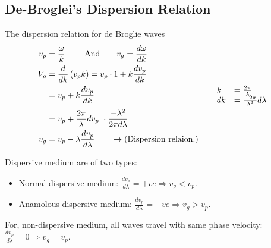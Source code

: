 \subsection{De-Broglei's Dispersion Relation}
The dispersion relation for de Broglie waves 
\begin{align}
v_{p}&=\frac{\omega}{k}\ \qquad \text{And}\qquad v_{g}=\frac{d\omega}{dk}\\
V_{g} &=\frac{d}{d k}\left(v_{p} k\right) 
=v_{p}\cdot 1+ k \frac{d v_{p}}{d k} \notag \\
&=v_{p}+k \frac{d v_{p}}{d{k}} \hspace{5cm}  \begin{array}{ll}
k&=\frac{2 \pi}{\lambda}\\
dk&=\frac{-2 \pi}{\lambda^{2}} d\lambda
\end{array}  \\
&=v_{p}+\frac{2 \pi}{\lambda}  d v_{p}\ \cdot \frac{-\lambda^{2}}{2 \pi d \lambda} \notag \\
v_{g} &=v_{p}-\lambda \frac{d v_{p}}{d \lambda}  \qquad\rightarrow (\text{Dispersion relaion.})
\end{align}
\begin{center}
\end{center}
Dispersive medium are of two types:
\begin{itemize}
	\item  Normal dispersive medium: $\frac{d v_{p}}{d \lambda}=+v e \Rightarrow v_{g}<v_{p}$.
	\item  Anamolous dispersive medium: $\frac{d v_{p}}{d \lambda}=-v e\Rightarrow v_{g}>v_{p}$.
\end{itemize}
For, non-dispersive medium, all waves travel with same phase velocity: $\frac{d v_{p}}{d \lambda}=0 \Rightarrow v_{g}=v_{p}$.
